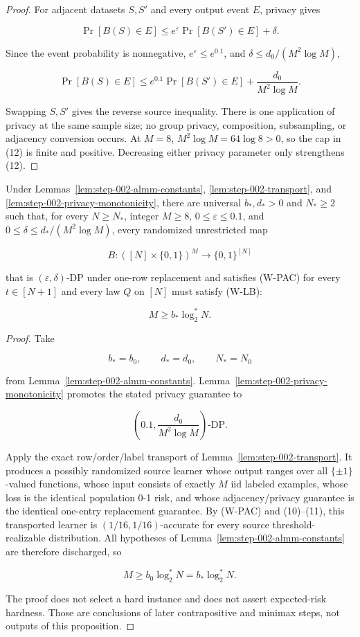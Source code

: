 \begin{proof}
For adjacent datasets \(S,S'\) and every output event \(E\), privacy gives

\[
\Pr[B(S)\in E]
\le e^{\varepsilon}\Pr[B(S')\in E]+\delta.
\]

Since the event probability is nonnegative, \(e^{\varepsilon}\le e^{0.1}\), and
\(\delta\le d_0/(M^2\log M)\),

\[
\Pr[B(S)\in E]
\le e^{0.1}\Pr[B(S')\in E]
   +\frac{d_0}{M^2\log M}.
\tag{12}
\]

Swapping \(S,S'\) gives the reverse source inequality. There is one application of privacy at the same sample size; no group privacy, composition, subsampling, or adjacency conversion occurs. At \(M=8\), \(M^2\log M=64\log8>0\), so the cap in (12) is finite and positive. Decreasing either privacy parameter only strengthens (12). \end{proof}

\begin{proposition}\label{prop:step-002-wrapper}
Under Lemmas~\ref{lem:step-002-almm-constants},
\ref{lem:step-002-transport}, and
\ref{lem:step-002-privacy-monotonicity}, there are universal
\(b_*,d_*>0\) and \(N_*\ge2\) such that, for every \(N\ge N_*\), integer \(M\ge8\),
\(0\le\varepsilon\le0.1\), and
\(0\le\delta\le d_*/(M^2\log M)\), every randomized unrestricted map

\[
B:([N]\times\{0,1\})^M\to\{0,1\}^{[N]}
\]

that is \((\varepsilon,\delta)\)-DP under one-row replacement and satisfies (W-PAC) for every \(t\in[N+1]\) and every law \(Q\) on \([N]\) must satisfy (W-LB):

\[
M\ge b_*\log_2^*N.
\]
\end{proposition}

\begin{proof}
Take

\[
b_*=b_0,\qquad d_*=d_0,\qquad N_*=N_0
\]

from Lemma~\ref{lem:step-002-almm-constants}. Lemma~\ref{lem:step-002-privacy-monotonicity} promotes the stated privacy guarantee to

\[
\left(0.1,\frac{d_0}{M^2\log M}\right)\text{-DP}.
\]

Apply the exact row/order/label transport of Lemma~\ref{lem:step-002-transport}. It produces a possibly randomized source learner whose output ranges over all \(\{\pm1\}\)-valued functions, whose input consists of exactly \(M\) iid labeled examples, whose loss is the identical population 0-1 risk, and whose adjacency/privacy guarantee is the identical one-entry replacement guarantee. By (W-PAC) and (10)--(11), this transported learner is \((1/16,1/16)\)-accurate for every source threshold-realizable distribution. All hypotheses of Lemma~\ref{lem:step-002-almm-constants} are therefore discharged, so

\[
M\ge b_0\log_2^*N=b_*\log_2^*N.
\]

The proof does not select a hard instance and does not assert expected-risk hardness. Those are conclusions of later contrapositive and minimax steps, not outputs of this proposition. \end{proof}
